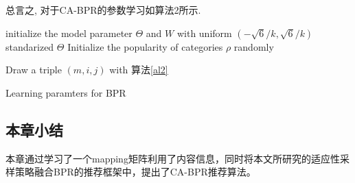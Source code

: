 总言之, 对于CA-BPR的参数学习如算法2所示.
\IncMargin{1em}
\begin{algorithm}
	\SetAlgoNoLine %
	
	
	\BlankLine
	initialize the model parameter $\Theta$ and $W$ with uniform $\left(-\sqrt{6}/{k},\sqrt{6}/{k}\right)$\;
	standarized $\Theta$\;
	Initialize the popularity of categories $\rho$ randomly\;
	\Repeat
		{}
		{Draw a triple $\left(m,i,j\right)$ with 算法\ref{al2}\;
			
		}
		
		
	\caption{Learning paramters for BPR\label{al3}}
	
\end{algorithm}
\DecMargin{1em}

\subsection{本章小结}
本章通过学习了一个mapping矩阵利用了内容信息，同时将本文所研究的适应性采样策略融合BPR的推荐框架中，提出了CA-BPR推荐算法。